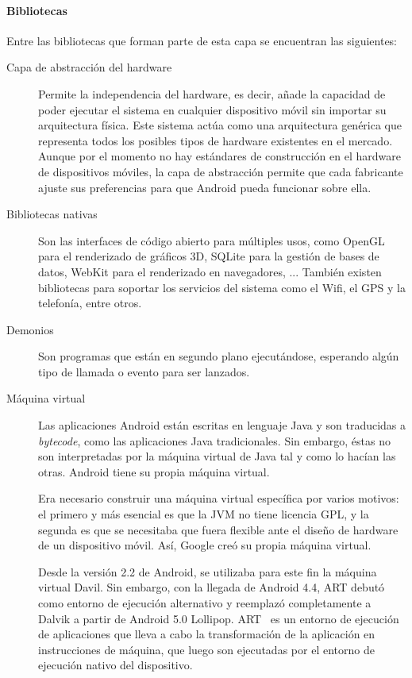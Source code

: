 \paragraph{Bibliotecas}

Entre las bibliotecas que forman parte de esta capa se encuentran las
siguientes:
\begin{description}
\item[Capa de abstracción del hardware] Permite la independencia del hardware,
  es decir, añade la capacidad de poder ejecutar el sistema en cualquier
  dispositivo móvil sin importar su arquitectura física. Este sistema actúa
  como una arquitectura genérica que representa todos los posibles tipos de
  hardware existentes en el mercado. Aunque por el momento no hay estándares de
  construcción en el hardware de dispositivos móviles, la capa de abstracción
  permite que cada fabricante ajuste sus preferencias para que Android pueda
  funcionar sobre ella.
  
\item[Bibliotecas nativas] Son las interfaces de código abierto para múltiples
  usos, como OpenGL para el renderizado de gráficos 3D, SQLite para la gestión
  de bases de datos, WebKit para el renderizado en navegadores, ... También
  existen bibliotecas para soportar los servicios del sistema como el Wifi,
  el GPS y la telefonía, entre otros.
  
\item[Demonios] Son programas que están en segundo plano ejecutándose, esperando
  algún tipo de llamada o evento para ser lanzados.

\item[Máquina virtual] Las aplicaciones Android están escritas en lenguaje Java
  y son traducidas a \textit{bytecode}, como las aplicaciones Java tradicionales.
  Sin embargo, éstas no son interpretadas por la máquina virtual de Java tal y
  como lo hacían las otras. Android tiene su propia máquina virtual.

  Era necesario construir una máquina virtual específica por varios motivos:
  el primero y más esencial es que la \ac{JVM} no tiene licencia GPL, y la
  segunda es que se necesitaba que fuera flexible ante el diseño de hardware de
  un dispositivo móvil. Así, Google creó su propia máquina virtual.

  Desde la versión 2.2 de Android, se utilizaba para este fin la máquina virtual
  Davil. Sin embargo, con la llegada de Android 4.4, ART debutó como entorno de
  ejecución alternativo y reemplazó completamente a Dalvik a partir de Android
  5.0 Lollipop. \ac{ART}~\cite{art-and-dalvik} es un entorno de ejecución de
  aplicaciones que lleva a cabo la transformación de la aplicación en
  instrucciones de máquina, que luego son ejecutadas por el entorno de ejecución
  nativo del dispositivo.  


\end{description}
